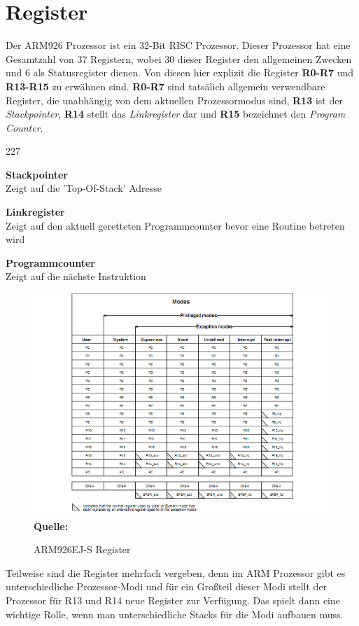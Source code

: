 \section{Register}
Der ARM926 Prozessor ist ein 32-Bit RISC Prozessor. Dieser Prozessor hat eine Gesamtzahl von 37 Registern\parencite[vgl.][44\psqq]{archManI}, wobei 30 dieser Register den allgemeinen Zwecken und 6 als Statusregister dienen. Von diesen hier explizit die Register \textbf{R0-R7} und \textbf{R13-R15} zu erw\"ahnen sind. \textbf{R0-R7} sind tats\"alich allgemein verwendbare Register, die unabh\"angig von dem aktuellen Prozessormodus sind, \textbf{R13} ist der \textit{Stackpointer}, \textbf{R14} stellt das \textit{Linkregister} dar und \textbf{R15} bezeichnet den \textit{Program Counter}.
\begin{dinglist}{227}
	\item{\textbf{Stackpointer}}\\
	Zeigt auf die 'Top-Of-Stack' Adresse
	\item{\textbf{Linkregister}}\\
	Zeigt auf den aktuell geretteten Programmcounter bevor eine Routine betreten wird
	\item{\textbf{Programmcounter}}\\
	Zeigt auf die n\"achste Instruktion
\end{dinglist}
\begin{figure}[H]
\center
\includegraphics[scale=0.7]{common/register.png}\\
\footnotesize\textbf{Quelle:}\parencite[43]{archManI}
\caption{ARM926EJ-S Register}
\end{figure}
Teilweise sind die Register mehrfach vergeben, denn im ARM Prozessor gibt es unterschiedliche Prozessor-Modi und f\"ur ein Gro\ss teil dieser Modi stellt der Prozessor f\"ur R13 und R14 neue Register zur Verf\"ugung. Das spielt dann eine wichtige Rolle, wenn man unterschiedliche Stacks f\"ur die Modi aufbauen muss.
